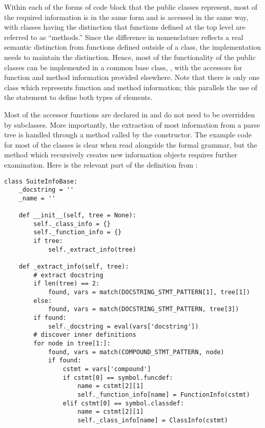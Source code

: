 Within each of the forms of code block that the public classes
represent, most of the required information is in the same form and is
accessed in the same way, with classes having the distinction that
functions defined at the top level are referred to as ``methods.''
Since the difference in nomenclature reflects a real semantic
distinction from functions defined outside of a class, the
implementation needs to maintain the distinction.
Hence, most of the functionality of the public classes can be
implemented in a common base class, , with the
accessors for function and method information provided elsewhere.
Note that there is only one class which represents function and method
information; this parallels the use of the  statement to
define both types of elements.

Most of the accessor functions are declared in 
and do not need to be overridden by subclasses.  More importantly, the
extraction of most information from a parse tree is handled through a
method called by the  constructor.  The example
code for most of the classes is clear when read alongside the formal
grammar, but the method which recursively creates new information
objects requires further examination.  Here is the relevant part of
the  definition from :

\begin{verbatim}
class SuiteInfoBase:
    _docstring = ''
    _name = ''

    def __init__(self, tree = None):
        self._class_info = {}
        self._function_info = {}
        if tree:
            self._extract_info(tree)

    def _extract_info(self, tree):
        # extract docstring
        if len(tree) == 2:
            found, vars = match(DOCSTRING_STMT_PATTERN[1], tree[1])
        else:
            found, vars = match(DOCSTRING_STMT_PATTERN, tree[3])
        if found:
            self._docstring = eval(vars['docstring'])
        # discover inner definitions
        for node in tree[1:]:
            found, vars = match(COMPOUND_STMT_PATTERN, node)
            if found:
                cstmt = vars['compound']
                if cstmt[0] == symbol.funcdef:
                    name = cstmt[2][1]
                    self._function_info[name] = FunctionInfo(cstmt)
                elif cstmt[0] == symbol.classdef:
                    name = cstmt[2][1]
                    self._class_info[name] = ClassInfo(cstmt)
\end{verbatim}


